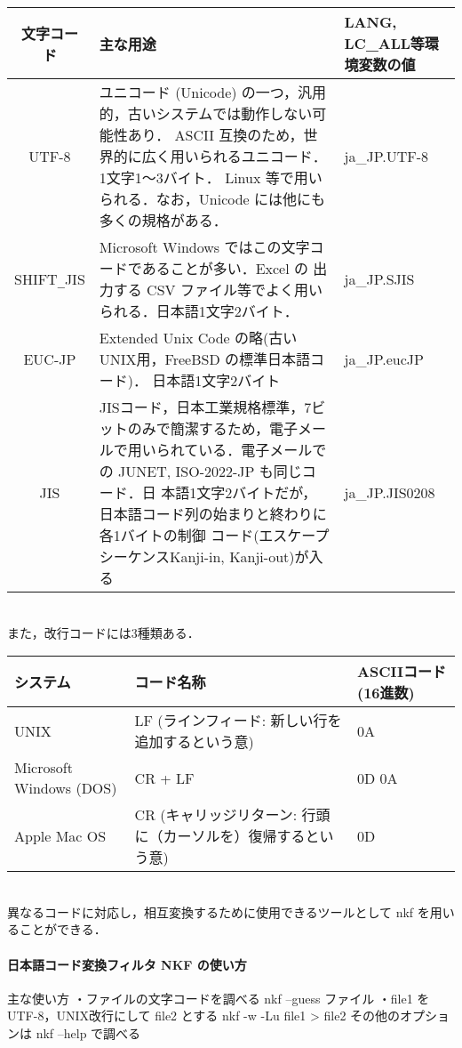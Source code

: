 \begin{tabular}[t]{c|p{7cm}|p{3cm}}
\hline \hline
文字コード & 主な用途 & LANG, LC\_ALL等環境変数の値 \\
\hline \hline
UTF-8 & ユニコード (Unicode) の一つ，汎用的，古いシステムでは動作しない可能性あり．
 ASCII 互換のため，世界的に広く用いられるユニコード．1文字1〜3バイト．
 Linux 等で用いられる．なお，Unicode には他にも多くの規格がある． &
 ja\_JP.UTF-8 \\
\hline
SHIFT\verb+_+JIS & Microsoft Windows ではこの文字コードであることが多い．Excel の
出力する CSV ファイル等でよく用いられる．日本語1文字2バイト． & ja\_JP.SJIS\\
\hline
EUC-JP & Extended Unix Code の略(古いUNIX用，FreeBSD の標準日本語コード)．
 日本語1文字2バイト &
 ja\_JP.eucJP\\
\hline
JIS & JISコード，日本工業規格標準，7ビットのみで簡潔するため，電子メー
 ルで用いられている．電子メールでの JUNET, ISO-2022-JP も同じコード．日
 本語1文字2バイトだが，日本語コード列の始まりと終わりに各1バイトの制御
 コード(エスケープシーケンスKanji-in, Kanji-out)が入る &
 ja\_JP.JIS0208\\
\hline \hline
\end{tabular}
\\

また，改行コードには3種類ある．

\begin{tabular}[t]{l|p{6cm}|p{4cm}}
\hline \hline
システム & コード名称 & ASCIIコード(16進数) \\
\hline \hline
UNIX & LF (ラインフィード: 新しい行を追加するという意) & 0A\\
\hline
Microsoft Windows (DOS) & CR + LF & 0D 0A\\
\hline
Apple Mac OS & CR (キャリッジリターン: 行頭に（カーソルを）復帰するとい
 う意) &
 0D\\
\hline \hline
\end{tabular}
\\
異なるコードに対応し，相互変換するために使用できるツールとして nkf を用いることができる．

\paragraph{日本語コード変換フィルタ NKF の使い方}

\begin{cli}
主な使い方
・ファイルの文字コードを調べる
  nkf --guess ファイル
・file1 を UTF-8，UNIX改行にして file2 とする
  nkf -w -Lu file1 > file2
その他のオプションは nkf --help で調べる
\end{cli}

